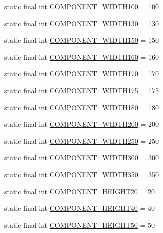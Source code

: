 \begin{DoxyCompactItemize}
\item 
static final int \hyperlink{class_display_1_1_display_a4cb90de4566da894b505b11cf51781ae}{C\+O\+M\+P\+O\+N\+E\+N\+T\+\_\+\+W\+I\+D\+T\+H100} = 100
\item 
static final int \hyperlink{class_display_1_1_display_ad5f14126c874c231b67965c6cdf06178}{C\+O\+M\+P\+O\+N\+E\+N\+T\+\_\+\+W\+I\+D\+T\+H130} = 130
\item 
static final int \hyperlink{class_display_1_1_display_a5684ec094f44cab075327577819190b9}{C\+O\+M\+P\+O\+N\+E\+N\+T\+\_\+\+W\+I\+D\+T\+H150} = 150
\item 
static final int \hyperlink{class_display_1_1_display_a86c529803c94d29b77776f4f56c85f14}{C\+O\+M\+P\+O\+N\+E\+N\+T\+\_\+\+W\+I\+D\+T\+H160} = 160
\item 
static final int \hyperlink{class_display_1_1_display_a8871b58d3f57d5b573779d8af759b7e3}{C\+O\+M\+P\+O\+N\+E\+N\+T\+\_\+\+W\+I\+D\+T\+H170} = 170
\item 
static final int \hyperlink{class_display_1_1_display_a2095098cda35e726fe595b019d78da96}{C\+O\+M\+P\+O\+N\+E\+N\+T\+\_\+\+W\+I\+D\+T\+H175} = 175
\item 
static final int \hyperlink{class_display_1_1_display_a4e3ec7ce466aae4eae284ff350b11253}{C\+O\+M\+P\+O\+N\+E\+N\+T\+\_\+\+W\+I\+D\+T\+H180} = 180
\item 
static final int \hyperlink{class_display_1_1_display_aa5010ddecefd4e39f45361172619b461}{C\+O\+M\+P\+O\+N\+E\+N\+T\+\_\+\+W\+I\+D\+T\+H200} = 200
\item 
static final int \hyperlink{class_display_1_1_display_a4e1ace15de5d4dd0aeb2af46c76742dd}{C\+O\+M\+P\+O\+N\+E\+N\+T\+\_\+\+W\+I\+D\+T\+H250} = 250
\item 
static final int \hyperlink{class_display_1_1_display_a2f111222b6c7d15359547d6f2cbcb01e}{C\+O\+M\+P\+O\+N\+E\+N\+T\+\_\+\+W\+I\+D\+T\+H300} = 300
\item 
static final int \hyperlink{class_display_1_1_display_a63262d6fdb082de5ca713249b0df7703}{C\+O\+M\+P\+O\+N\+E\+N\+T\+\_\+\+W\+I\+D\+T\+H350} = 350
\item 
static final int \hyperlink{class_display_1_1_display_a205927f3e051ee88782c185b37c9e1d5}{C\+O\+M\+P\+O\+N\+E\+N\+T\+\_\+\+H\+E\+I\+G\+H\+T20} = 20
\item 
static final int \hyperlink{class_display_1_1_display_a35a9ab87eca962392fe25c040f594824}{C\+O\+M\+P\+O\+N\+E\+N\+T\+\_\+\+H\+E\+I\+G\+H\+T40} = 40
\item 
static final int \hyperlink{class_display_1_1_display_a3d4ecbb587bdb35ff4e27f0ce4f35e4a}{C\+O\+M\+P\+O\+N\+E\+N\+T\+\_\+\+H\+E\+I\+G\+H\+T50} = 50

\end{DoxyCompactItemize}
